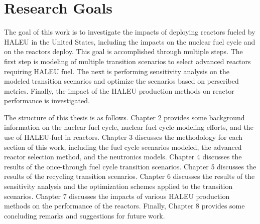 \section{Research Goals}
The goal of this work is to investigate the impacts of deploying reactors fueled by 
\gls{HALEU} in the United States, including the impacts on the nuclear fuel cycle and 
on the reactors deploy. This goal is accomplished 
through multiple steps. The first step is modeling of multiple transition scenarios
to select advanced reactors requiring \gls{HALEU} fuel. The next is performing 
sensitivity analysis on the modeled transition scenarios and optimize the scenarios
based on perscribed metrics. Finally, the impact of the \gls{HALEU} production 
methods on reactor performance is investigated. 

The structure of this thesis is as follows. Chapter 2 provides some 
background information on the nuclear fuel cycle, nuclear fuel cycle 
modeling efforts, and the use of \gls{HALEU}-fuel in reactors.
Chapter 3 discusses the methodology for each section of this work, 
including the fuel cycle scenarios modeled, the advanced reactor selection 
method, and the neutronics models. Chapter 4 discusses the results of the 
once-through fuel cycle transition scenarios. Chapter 5 discusses the 
results of the recycling transition scenarios. Chapter 6 discusses the results 
of the sensitivity analysis and the optimization schemes applied to the 
transition scenarios. Chapter 7 discusses the impacts of various \gls{HALEU}
production methods on the performance of the reactors. Finally, Chapter 
8 provides some concluding remarks and suggestions for future work. 